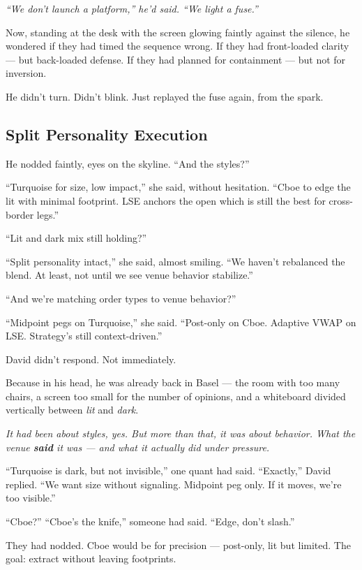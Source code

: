 \textit{“We don’t launch a platform,” he’d said. “We light a fuse.”}

Now, standing at the desk with the screen glowing faintly against the silence,
he wondered if they had timed the sequence wrong.
If they had front-loaded clarity — but back-loaded defense.
If they had planned for containment — but not for inversion.

He didn’t turn.
Didn’t blink.
Just replayed the fuse again, from the spark.




\subsection{Split Personality Execution}

He nodded faintly, eyes on the skyline. “And the styles?”

“Turquoise for size, low impact,” she said, without hesitation. “Cboe to edge the lit with minimal footprint. 
LSE anchors the open which is still the best for cross-border legs.”

“Lit and dark mix still holding?”

“Split personality intact,” she said, almost smiling. “We haven’t rebalanced the blend. At least, not 
until we see venue behavior stabilize.”

“And we’re matching order types to venue behavior?”

“Midpoint pegs on Turquoise,” she said. “Post-only on Cboe. Adaptive VWAP on LSE. Strategy’s still 
context-driven.”

David didn’t respond. Not immediately.

Because in his head, he was already back in Basel —
the room with too many chairs, a screen too small for the number of opinions,
and a whiteboard divided vertically between \textit{lit} and \textit{dark}.

\textit{It had been about styles, yes. But more than that, it was about behavior.
What the venue \textbf{said} it was — and what it actually did under pressure.}

“Turquoise is dark, but not invisible,” one quant had said.
“Exactly,” David replied. “We want size without signaling. Midpoint peg only. If it moves, we’re too visible.”

“Cboe?”
“Cboe’s the knife,” someone had said. “Edge, don’t slash.”

They had nodded. Cboe would be for precision — post-only, lit but limited.
The goal: extract without leaving footprints.

